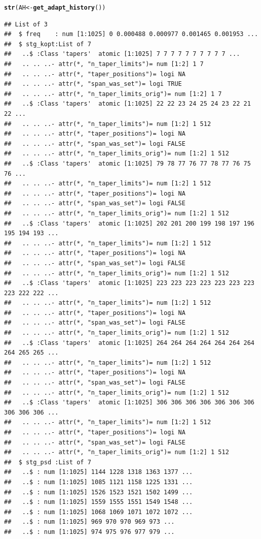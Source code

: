 \documentclass{article}\usepackage{graphicx, color}
\makeatletter
\newcommand{\hlfunctioncall}[1]{\textcolor[rgb]{0.501960784313725,0,0.329411764705882}{\textbf{#1}}}%
\newenvironment{kframe}{%
 \def\at@end@of@kframe{}%
 \ifinner\ifhmode%
  \def\at@end@of@kframe{\end{minipage}}%
  \begin{minipage}{\columnwidth}%
 \fi\fi%
 \def\FrameCommand##1{\hskip\@totalleftmargin \hskip-\fboxsep
 \colorbox{shadecolor}{##1}\hskip-\fboxsep
     \hskip-\linewidth \hskip-\@totalleftmargin \hskip\columnwidth}%
 \MakeFramed {\advance\hsize-\width
   \@totalleftmargin\z@ \linewidth\hsize
   \@setminipage}}%
 {\par\unskip\endMakeFramed%
 \at@end@of@kframe}
\newenvironment{knitrout}{}{} %
\makeatother
\begin{document}
\begin{knitrout}
\begin{kframe}
{\ttfamily\noindent\itshape\color{messagecolor}{\#\# Normalized\ \ single-sided PSD\ \ (PSD)\ \ to single-sided PSD for sampling-freq.\ \ 1}}\begin{alltt}
\hlfunctioncall{str}(AH <- \hlfunctioncall{get_adapt_history}())
\end{alltt}
\begin{verbatim}
## List of 3
##  $ freq    : num [1:1025] 0 0.000488 0.000977 0.001465 0.001953 ...
##  $ stg_kopt:List of 7
##   ..$ :Class 'tapers'  atomic [1:1025] 7 7 7 7 7 7 7 7 7 7 ...
##   .. .. ..- attr(*, "n_taper_limits")= num [1:2] 1 7
##   .. .. ..- attr(*, "taper_positions")= logi NA
##   .. .. ..- attr(*, "span_was_set")= logi TRUE
##   .. .. ..- attr(*, "n_taper_limits_orig")= num [1:2] 1 7
##   ..$ :Class 'tapers'  atomic [1:1025] 22 22 23 24 25 24 23 22 21 22 ...
##   .. .. ..- attr(*, "n_taper_limits")= num [1:2] 1 512
##   .. .. ..- attr(*, "taper_positions")= logi NA
##   .. .. ..- attr(*, "span_was_set")= logi FALSE
##   .. .. ..- attr(*, "n_taper_limits_orig")= num [1:2] 1 512
##   ..$ :Class 'tapers'  atomic [1:1025] 79 78 77 76 77 78 77 76 75 76 ...
##   .. .. ..- attr(*, "n_taper_limits")= num [1:2] 1 512
##   .. .. ..- attr(*, "taper_positions")= logi NA
##   .. .. ..- attr(*, "span_was_set")= logi FALSE
##   .. .. ..- attr(*, "n_taper_limits_orig")= num [1:2] 1 512
##   ..$ :Class 'tapers'  atomic [1:1025] 202 201 200 199 198 197 196 195 194 193 ...
##   .. .. ..- attr(*, "n_taper_limits")= num [1:2] 1 512
##   .. .. ..- attr(*, "taper_positions")= logi NA
##   .. .. ..- attr(*, "span_was_set")= logi FALSE
##   .. .. ..- attr(*, "n_taper_limits_orig")= num [1:2] 1 512
##   ..$ :Class 'tapers'  atomic [1:1025] 223 223 223 223 223 223 223 223 222 222 ...
##   .. .. ..- attr(*, "n_taper_limits")= num [1:2] 1 512
##   .. .. ..- attr(*, "taper_positions")= logi NA
##   .. .. ..- attr(*, "span_was_set")= logi FALSE
##   .. .. ..- attr(*, "n_taper_limits_orig")= num [1:2] 1 512
##   ..$ :Class 'tapers'  atomic [1:1025] 264 264 264 264 264 264 264 264 265 265 ...
##   .. .. ..- attr(*, "n_taper_limits")= num [1:2] 1 512
##   .. .. ..- attr(*, "taper_positions")= logi NA
##   .. .. ..- attr(*, "span_was_set")= logi FALSE
##   .. .. ..- attr(*, "n_taper_limits_orig")= num [1:2] 1 512
##   ..$ :Class 'tapers'  atomic [1:1025] 306 306 306 306 306 306 306 306 306 306 ...
##   .. .. ..- attr(*, "n_taper_limits")= num [1:2] 1 512
##   .. .. ..- attr(*, "taper_positions")= logi NA
##   .. .. ..- attr(*, "span_was_set")= logi FALSE
##   .. .. ..- attr(*, "n_taper_limits_orig")= num [1:2] 1 512
##  $ stg_psd :List of 7
##   ..$ : num [1:1025] 1144 1228 1318 1363 1377 ...
##   ..$ : num [1:1025] 1085 1121 1158 1225 1331 ...
##   ..$ : num [1:1025] 1526 1523 1521 1502 1499 ...
##   ..$ : num [1:1025] 1559 1555 1551 1549 1548 ...
##   ..$ : num [1:1025] 1068 1069 1071 1072 1072 ...
##   ..$ : num [1:1025] 969 970 970 969 973 ...
##   ..$ : num [1:1025] 974 975 976 977 979 ...
\end{verbatim}
\end{kframe}
\end{knitrout}
\end{document}
